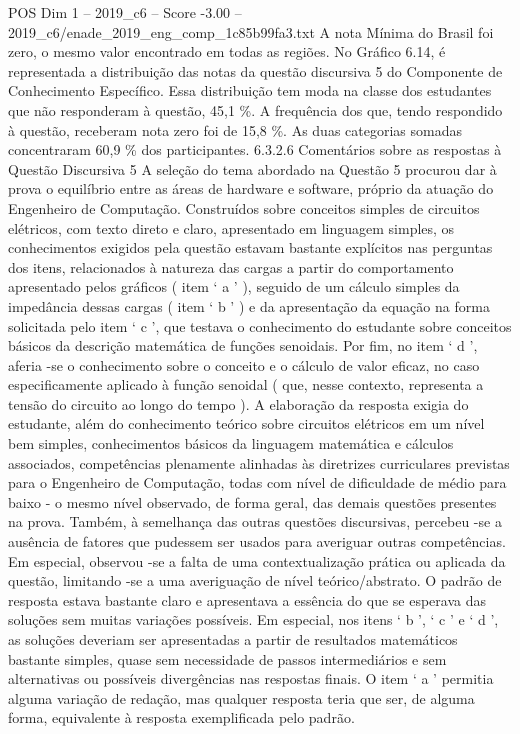 \begin{textsample}{POS Dim 1 – 2019\_c6 – Score -3.00 – 2019\_c6/enade\_2019\_eng\_comp\_1c85b99fa3.txt}
A nota Mínima do Brasil foi zero, o mesmo valor encontrado em todas as regiões.
No Gráfico 6.14, é representada a distribuição das notas da questão discursiva 5 do Componente de Conhecimento Específico.
Essa distribuição tem moda na classe dos estudantes que não responderam à questão, 45,1 \%.
A frequência dos que, tendo respondido à questão, receberam nota zero foi de 15,8 \%.
As duas categorias somadas concentraram 60,9 \% dos participantes. 6.3.2.6 Comentários sobre as respostas à Questão Discursiva 5 A seleção do tema abordado na Questão 5 procurou dar à prova o equilíbrio entre as áreas de hardware e software, próprio da atuação do Engenheiro de Computação.
Construídos sobre conceitos simples de circuitos elétricos, com texto direto e claro, apresentado em linguagem simples, os conhecimentos exigidos pela questão estavam bastante explícitos nas perguntas dos itens, relacionados à natureza das cargas a partir do comportamento apresentado pelos gráficos ( item ‘ a ’ ), seguido de um cálculo simples da impedância dessas cargas ( item ‘ b ’ ) e da apresentação da equação na forma solicitada pelo item ‘ c ’, que testava o conhecimento do estudante sobre conceitos básicos da descrição matemática de funções senoidais.
Por fim, no item ‘ d ’, aferia -se o conhecimento sobre o conceito e o cálculo de valor eficaz, no caso especificamente aplicado à função senoidal ( que, nesse contexto, representa a tensão do circuito ao longo do tempo ).
A elaboração da resposta exigia do estudante, além do conhecimento teórico sobre circuitos elétricos em um nível bem simples, conhecimentos básicos da linguagem matemática e cálculos associados, competências plenamente alinhadas às diretrizes curriculares previstas para o Engenheiro de Computação, todas com nível de dificuldade de médio para baixo - o mesmo nível observado, de forma geral, das demais questões presentes na prova.
Também, à semelhança das outras questões discursivas, percebeu -se a ausência de fatores que pudessem ser usados para averiguar outras competências.
Em especial, observou -se a falta de uma contextualização prática ou aplicada da questão, limitando -se a uma averiguação de nível teórico/abstrato.
O padrão de resposta estava bastante claro e apresentava a essência do que se esperava das soluções sem muitas variações possíveis.
Em especial, nos itens ‘ b ’, ‘ c ’ e ‘ d ’, as soluções deveriam ser apresentadas a partir de resultados matemáticos bastante simples, quase sem necessidade de passos intermediários e sem alternativas ou possíveis divergências nas respostas finais.
O item ‘ a ’ permitia alguma variação de redação, mas qualquer resposta teria que ser, de alguma forma, equivalente à resposta exemplificada pelo padrão.

\end{textsample}
